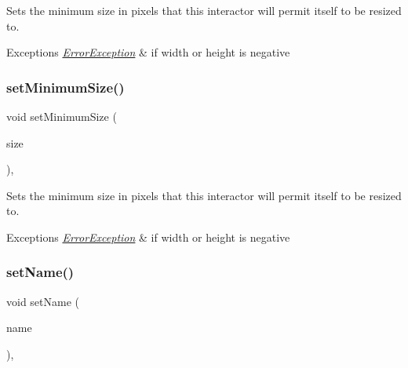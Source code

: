 Sets the minimum size in pixels that this interactor will permit itself to be resized to. 


\begin{DoxyExceptions}{Exceptions}
{\em \mbox{\hyperlink{classErrorException}{Error\+Exception}}} & if width or height is negative \\
\hline
\end{DoxyExceptions}
\mbox{\label{classGInteractor_a3b1046117ac6cb7abe467e00ba8a81f4}} 
\subsubsection{\texorpdfstring{set\+Minimum\+Size()}{setMinimumSize()}\hspace{0.1cm}{\footnotesize\ttfamily [2/2]}}
{\footnotesize\ttfamily void set\+Minimum\+Size (\begin{DoxyParamCaption}\item[{const \mbox{\hyperlink{classGDimension}{G\+Dimension}} \&}]{size }\end{DoxyParamCaption})\hspace{0.3cm}{\ttfamily [virtual]}, {\ttfamily [inherited]}}



Sets the minimum size in pixels that this interactor will permit itself to be resized to. 


\begin{DoxyExceptions}{Exceptions}
{\em \mbox{\hyperlink{classErrorException}{Error\+Exception}}} & if width or height is negative \\
\hline
\end{DoxyExceptions}
\mbox{\label{classGInteractor_a9d3a2685df23b5e7cbf59c19c4a1f9b5}} 
\subsubsection{\texorpdfstring{set\+Name()}{setName()}}
{\footnotesize\ttfamily void set\+Name (\begin{DoxyParamCaption}\item[{const std\+::string \&}]{name }\end{DoxyParamCaption})\hspace{0.3cm}{\ttfamily [virtual]}, {\ttfamily [inherited]}}



